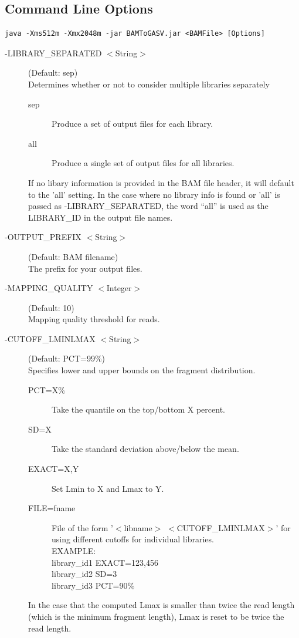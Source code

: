 \documentclass[11pt]{article}
\begin{document}
\subsection{Command Line Options}
\label{sec:BTGCLO}

\begin{Verbatim}[frame=single]
java -Xms512m -Xmx2048m -jar BAMToGASV.jar <BAMFile> [Options]
\end{Verbatim}
     
\begin{description}
\item[-LIBRARY\_SEPARATED $<$String$>$] (Default: sep)\\
Determines whether or not to consider multiple libraries separately
\begin{description}
\item[sep] Produce a set of output files for each library.
\item[all] Produce a single set of output files for all libraries.
\end{description}
If no libary information is provided in the BAM file header, it will default to the 'all' setting. In the case where no library info is found or 'all' is passed as -LIBRARY\_SEPARATED, the word ``all'' is used as the LIBRARY\_ID in the output file names.

\item[-OUTPUT\_PREFIX $<$String$>$] (Default: BAM filename)\\
The prefix for your output files.

\item[-MAPPING\_QUALITY $<$Integer$>$] (Default: 10) \\
Mapping quality threshold for reads.

\item[-CUTOFF\_LMINLMAX $<$String$>$] (Default: PCT=99\%)\\
Specifies lower and upper bounds on the fragment distribution.
\begin{description}
\item[PCT=X\%] Take the quantile on the top/bottom X percent. 
\item[SD=X] Take the standard deviation above/below the mean.
\item[EXACT=X,Y] Set Lmin to X and Lmax to Y.
\item[FILE=fname] File of the form '$<$libname$>$ $<$CUTOFF\_LMINLMAX$>$' for using different cutoffs for individual libraries.\\
\noindent EXAMPLE: \\
\noindent library\_id1 EXACT=123,456\\
\noindent library\_id2 SD=3\\
\noindent library\_id3 PCT=90\%
\end{description}
In the case that the computed Lmax is smaller than twice the read length (which is the minimum fragment length), Lmax is reset to be twice the read length.


\end{description}
\end{document}
